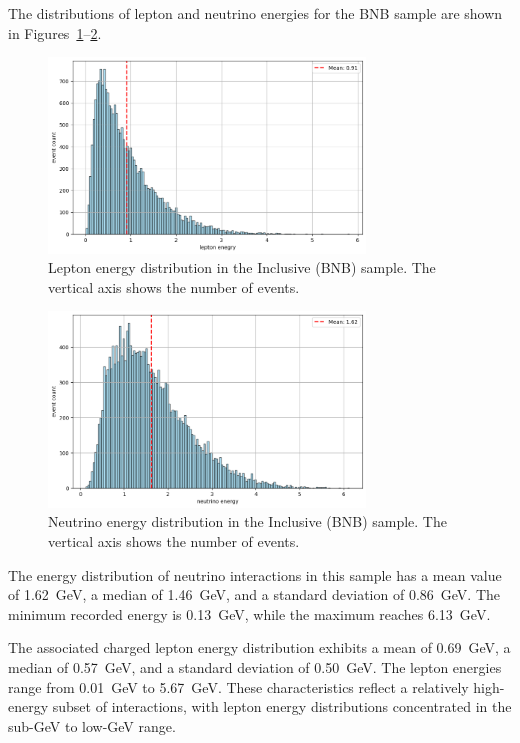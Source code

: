 \documentclass{pracalicmgr}
\begin{document}
The distributions of lepton and neutrino energies for the BNB sample are shown in Figures~\ref{fig:lepton-inclusive}--\ref{fig:neutrino-inclusive}.

\begin{figure}[H]
    \centering
    \includegraphics[width=0.75\textwidth]{src/leptonMuon.png}
    \caption{Lepton energy distribution in the Inclusive (BNB) sample. The vertical axis shows the number of events.}
    \label{fig:lepton-inclusive}
\end{figure}

\begin{figure}[H]
    \centering
    \includegraphics[width=0.75\textwidth]{src/neutrinoMuon.png}
    \caption{Neutrino energy distribution in the Inclusive (BNB) sample. The vertical axis shows the number of events.}
    \label{fig:neutrino-inclusive}
\end{figure}

The energy distribution of neutrino interactions in this sample has a mean value of 1.62~GeV, a median of 1.46~GeV, and a standard deviation of 0.86~GeV. The minimum recorded energy is 0.13~GeV, while the maximum reaches 6.13~GeV.

The associated charged lepton energy distribution exhibits a mean of 0.69~GeV, a median of 0.57~GeV, and a standard deviation of 0.50~GeV. The lepton energies range from 0.01~GeV to 5.67~GeV. These characteristics reflect a relatively high-energy subset of interactions, with lepton energy distributions concentrated in the sub-GeV to low-GeV range.
\end{document}
